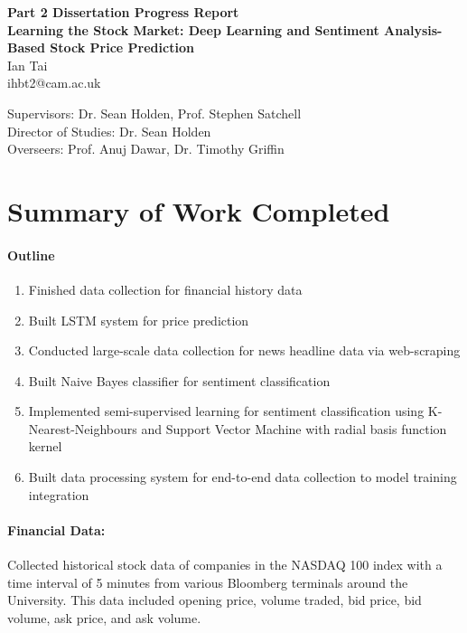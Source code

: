 \documentclass[12pt]{article}
\begin{document}
\begin{center}
\textbf{\large{Part 2 Dissertation Progress Report\\}}
\vspace{3mm}
\textbf{\large{Learning the Stock Market: Deep Learning and Sentiment Analysis-Based Stock Price Prediction\\}}
\vspace{3mm}
\normalsize{Ian Tai \\
		ihbt2@cam.ac.uk\\}
\end{center}
Supervisors: Dr. Sean Holden, Prof. Stephen Satchell\\
Director of Studies: Dr. Sean Holden\\
Overseers: Prof. Anuj Dawar, Dr. Timothy Griffin\\

\section*{Summary of Work Completed}

\paragraph{Outline}
\begin{enumerate}
\item Finished data collection for financial history data
\item Built LSTM system for price prediction
\item Conducted large-scale data collection for news headline
data via web-scraping
\item Built Naive Bayes classifier for sentiment classification
\item Implemented semi-supervised learning for sentiment classification
using K-Nearest-Neighbours and Support Vector Machine with radial 
basis function kernel
\item Built data processing system for end-to-end data collection to
model training integration
\end{enumerate}

\paragraph{Financial Data:}
Collected historical stock data of companies in the NASDAQ 100 index
with a time interval of 5 minutes from various Bloomberg terminals 
around the University. This data included opening price, volume 
traded, bid price, bid volume, ask price, and ask volume.
\end{document}
